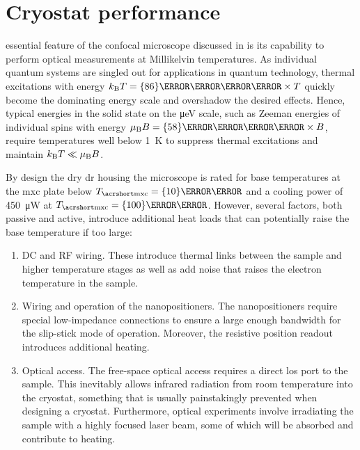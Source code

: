 \chapter{Cryostat performance}\label{ch:setup:cooling}
 essential feature of the confocal microscope discussed in \thethesis is its capability to perform optical measurements at Millikelvin temperatures.
As individual quantum systems are singled out for applications in quantum technology, thermal excitations with energy $\kb T = \qty{86}{\micro\eV\per\kelvin}\times T$ quickly become the dominating energy scale and overshadow the desired effects.
Hence, typical energies in the solid state on the \unit{\micro\eV} scale, such as Zeeman energies of individual spins with energy $\mub B = \qty{58}{\micro\eV\per\tesla}\times B$, require temperatures well below \qty{1}{\kelvin} to suppress thermal excitations and maintain $k_{\mathrm{B}} T \ll \mu_{\mathrm{B}} B$.

By design the \odin dry \gls{dr} housing the microscope is rated for base temperatures at the \acrfull{mxc} plate below $\Tmxc=\qty{10}{\milli\kelvin}$ and a cooling power of \qty{450}{\micro\watt} at $\Tmxc=\qty{100}{\milli\kelvin}$.
However, several factors, both passive and active, introduce additional heat loads that can potentially raise the base temperature if too large:
\begin{enumerate}
    \item \label{itm:setup:cooling:wiring}
    DC and RF wiring.
    These introduce thermal links between the sample and higher temperature stages as well as add noise that raises the electron temperature in the sample.
    \item \label{itm:setup:cooling:positioners}
    Wiring and operation of the \positioner nanopositioners.
    The nanopositioners require special low-impedance connections to ensure a large enough bandwidth for the slip-stick mode of operation.
    Moreover, the resistive position readout introduces additional heating.
    \item \label{itm:setup:cooling:optical}
    Optical access.
    The free-space optical access requires a direct \gls{los} port to the sample.
    This inevitably allows infrared radiation from room temperature into the cryostat, something that is usually painstakingly prevented when designing a cryostat.
    Furthermore, optical experiments involve irradiating the sample with a highly focused laser beam, some of which will be absorbed and contribute to heating.
\end{enumerate}

